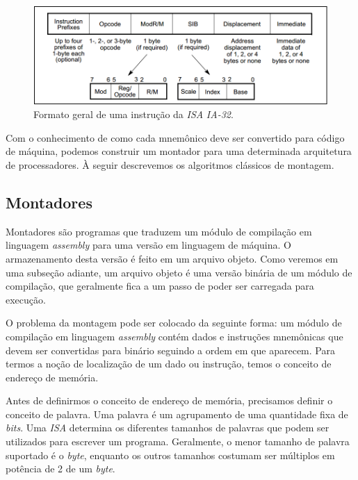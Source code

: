 \begin{figure}[ptb]
  \begin{center}
    \includegraphics[scale=.45]{imagens/instrucoes_ia32}
  \end{center}
  \caption{Formato geral de uma instrução da \textit{ISA} \textit{IA-32}.}
  \label{instrucoes_ia32}
\end{figure}

Com o conhecimento de como cada mnemônico deve ser convertido para código de
máquina, podemos construir um montador para uma determinada arquitetura de
processadores. À seguir descrevemos os algoritmos clássicos de montagem.

\subsection{Montadores}

Montadores são programas que traduzem um módulo de compilação em linguagem
\textit{assembly} para uma versão em linguagem de máquina. O armazenamento desta
versão é feito em um arquivo objeto. Como veremos em uma subseção adiante, um
arquivo objeto é uma versão binária de um módulo de compilação, que geralmente
fica a um passo de poder ser carregada para execução.

O problema da montagem pode ser colocado da seguinte forma: um módulo de
compilação em linguagem \textit{assembly} contém dados e instruções mnemônicas
que devem ser convertidas para binário seguindo a ordem em que aparecem. Para
termos a noção de localização de um dado ou instrução, temos o conceito de
endereço de memória.

Antes de definirmos o conceito de endereço de memória, precisamos definir o
conceito de palavra. Uma palavra é um agrupamento de uma quantidade fixa de
\textit{bits}. Uma \textit{ISA} determina os diferentes tamanhos de palavras que
podem ser utilizados para escrever um programa. Geralmente, o menor tamanho de
palavra suportado é o \textit{byte}, enquanto os outros tamanhos costumam ser
múltiplos em potência de 2 de um \textit{byte}.

